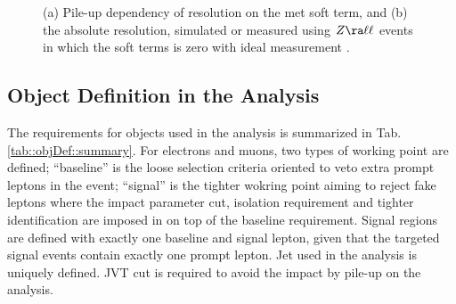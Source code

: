 \begin{figure}[h]
  \centering
    \caption{ (a) Pile-up dependency of resolution on the met soft term, and (b) the absolute resolution,
      simulated or measured using $Z\ra \ell\ell$ events in which the soft terms is zero with ideal measurement \cite{177_MET_data2016}. 
      \label{fig::objDef::metPerformance}
 }
\end{figure}



\subsection{Object Definition in the Analysis} \label{sec::objDef::objDef}
The requirements for objects used in the analysis is summarized in Tab. \ref{tab::objDef::summary}.
For electrons and muons, two types of working point are defined;
``baseline'' is the loose selection criteria oriented to veto extra prompt leptons in the event; 
``signal'' is the tighter wokring point aiming to reject fake leptons where the impact parameter cut, isolation requirement and tighter identification are imposed in on top of the baseline requirement.
Signal regions are defined with exactly one baseline and signal lepton, given that the targeted signal events contain exactly one prompt lepton. Jet used in the analysis is uniquely defined. JVT cut is required to avoid the impact by pile-up on the analysis. \\


